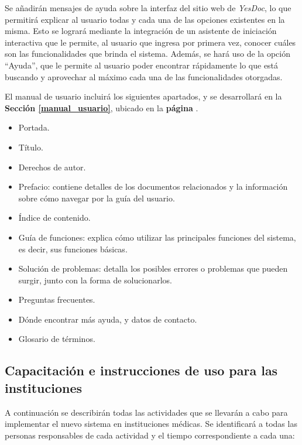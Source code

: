 \documentclass[a4paper,12pt]{article}
\begin{document}
Se añadirán mensajes de ayuda sobre la interfaz del sitio web de \textit{YesDoc}, lo que permitirá explicar al usuario todas y cada una de las opciones existentes en la misma.
Esto se logrará mediante la integración de un asistente de iniciación interactiva que le permite, al usuario que ingresa por primera vez, conocer cuáles son las funcionalidades que brinda el sistema.
Además, se hará uso de la opción ``Ayuda'', que le permite al usuario poder encontrar rápidamente lo que está buscando y aprovechar al máximo cada una de las funcionalidades otorgadas.

El manual de usuario incluirá los siguientes apartados, y se desarrollará en la \textbf{Sección \ref{manual_usuario}}, ubicado en la \textbf{página \pageref{manual_usuario}}. %
    \begin{itemize}
        \item   Portada.
        \item   Título.
        \item   Derechos de autor.
        \item   Prefacio: contiene detalles de los documentos relacionados y la información sobre cómo navegar por la guía del usuario.
        \item   Índice de contenido.
        \item   Guía de funciones: explica cómo utilizar las principales funciones del sistema, es decir, sus funciones básicas.
        \item   Solución de problemas: detalla los posibles errores o problemas que pueden surgir, junto con la forma de solucionarlos.
        \item   Preguntas frecuentes.
        \item   Dónde encontrar más ayuda, y datos de contacto.
        \item   Glosario de términos. %

    \end{itemize}
    
\subsection{Capacitación e instrucciones de uso para las instituciones}

A continuación se describirán todas las actividades que se llevarán a cabo para implementar el nuevo sistema en instituciones médicas. Se identificará a todas las personas responsables de cada actividad  y el tiempo correspondiente a cada una:
\end{document}
